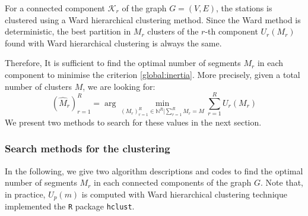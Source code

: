 For a connected component $\mathcal{K}_r$ of the graph $G=(V, E)$, the stations is clustered using a Ward hierarchical clustering method. Since the Ward method is deterministic, the best partition in $M_r$ clusters of the $r$-th component $U_r(M_r)$ found with Ward hierarchical clustering is always the same. 

Therefore, It is sufficient to find the optimal number of segments $M_r$ in each component to minimise the criterion \eqref{global:inertia}. More precisely, given a total number of clusters $M$, we are looking for: 
\begin{equation}\label{chp:5:estim:clust}
(\widehat{M}_r)_{r=1}^R = \arg\min_{(M_r)_{r=1}^R\in\mathbb{N}^R\vert \sum_{r=1}^R M_r = M}\sum_{r=1}^RU_r(M_r) 
\end{equation}
We present two methods to search for these values in the next section.




\subsubsection{Search methods for the clustering}  

In the following, we give two algorithm descriptions and codes to find the optimal number of segments $M_r$ in each connected components of the graph $G$. Note that, in practice, $U_p(m)$ is computed with Ward hierarchical clustering technique implemented the \texttt{R} package \texttt{hclust}. 

